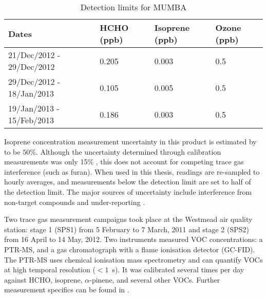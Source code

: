       
      \begin{table}
        \caption{Detection limits for MUMBA}
        \begin{tabular}{  l |  l  l  l }
          
          \textbf{Dates} & \textbf{HCHO (ppb)} & \textbf{Isoprene (ppb)} & \textbf{Ozone (ppb)}
          \\ \hline
          21/Dec/2012 - 29/Dec/2012 & 0.205 & 0.003 & 0.5 \\
          29/Dec/2012 - 18/Jan/2013 & 0.105 & 0.005 & 0.5 \\
          19/Jan/2013 - 15/Feb/2013 & 0.186 & 0.003 & 0.5 \\
        \end{tabular}
        \label{Model:datasets:MUMBA:tab_detectionlimits}
      \end{table}
      
      Isoprene concentration measurement uncertainty in this product is estimated by \textcite{Dunne2018} to be $50\%$.
      Although the uncertainty determined through calibration measurements was only 15\% \parencite{Guerette2018}, this does not account for competing trace gas interference (such as furan).
      When used in this thesis, readings are re-sampled to hourly averages, and measurements below the detection limit are set to half of the detection limit.
      The major sources of uncertainty include interference from non-target compounds and under-reporting \parencite[e.g.,][]{Dunne2018,Guerette2018}.
      
      
    \label{Model:datasets:SPS}
      Two trace gas measurement campaigns took place at the Westmead air quality station: %
      stage 1 (SPS1) from 5 February to 7 March, 2011 and stage 2 (SPS2) from 16 April to 14 May, 2012.
      Two instruments measured VOC concentrations: a PTR-MS, and a gas chromatograph with a flame ionisation detector (GC-FID).
      The PTR-MS uses chemical ionisation mass spectrometry and can quantify VOCs at high temporal resolution ($< 1$~s).
      It was calibrated several times per day against HCHO, isoprene, $\alpha$-pinene, and several other VOCs.
      Further measurement specifics can be found in \textcite{Dunne2018}.
      

